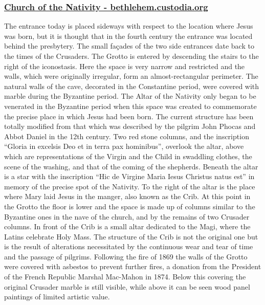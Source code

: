 \documentclass[letterpaper]{report}
\begin{document}
\begin{multicols}{2}
\subsubsection{\href{http://www.bethlehem.custodia.org/default.asp?id=469}{
Church of the Nativity - bethlehem.custodia.org}}

The entrance today is placed sideways with respect to the location where Jesus was born, but it is thought that in the fourth century the entrance was located behind the presbytery. The small façades of the two side entrances date back to the times of the Crusaders.
The Grotto is entered by descending the stairs to the right of the iconostasis. Here the space is very narrow and restricted and the walls, which were originally irregular, form an almost-rectangular perimeter. The natural walls of the cave, decorated in the Constantine period, were covered with marble during the Byzantine period.
The Altar of the Nativity only began to be venerated in the Byzantine period when this space was created to commemorate the precise place in which Jesus had been born.
The current structure has been totally modified from that which was described by the pilgrim John Phocas and Abbot Daniel in the 12th century. Two red stone columns, and the inscription “Gloria in excelsis Deo et in terra pax hominibus”, overlook the altar, above which are representations of the Virgin and the Child in swaddling clothes, the scene of the washing, and that of the coming of the shepherds.
Beneath the altar is a star with the inscription “Hic de Virgine Maria Iesus Christus natus est” in memory of the precise spot of the Nativity. To the right of the altar is the place where Mary laid Jesus in the manger, also known as the Crib. At this point in the Grotto the floor is lower and the space is made up of columns similar to the Byzantine ones in the nave of the church, and by the remains of two Crusader columns.
In front of the Crib is a small altar dedicated to the Magi, where the Latins celebrate Holy Mass. The structure of the Crib is not the original one but is the result of alterations necessitated by the continuous wear and tear of time and the passage of pilgrims.
Following the fire of 1869 the walls of the Grotto were covered with asbestos to prevent further fires, a donation from the President of the French Republic Marshal Mac-Mahon in 1874. Below this covering the original Crusader marble is still visible, while above it can be seen wood panel paintings of limited artistic value.

\end{multicols}
\end{document}
